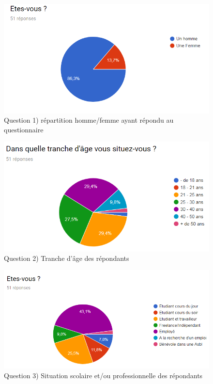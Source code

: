 \documentclass[a4paper,fleqn,12pt,oneside]{report}
\begin{document}
\begin{figure}[!ht]
\centering
\includegraphics[scale=1]{figures/QHF.png}
\caption{Question 1) répartition homme/femme ayant répondu au questionnaire}
\label{fig:QHF}
\end{figure}

\begin{figure}[!ht]
\centering
\includegraphics[scale=1]{figures/QAge.png}
\caption{Question 2) Tranche d'âge des répondants}
\label{fig:QAge}
\end{figure}

\newpage
{}

\begin{figure}[!ht]
\centering
\includegraphics[scale=1]{figures/QStatus.png}
\caption{Question 3) Situation scolaire et/ou professionnelle des répondants}
\label{fig:QStatus}
\end{figure}
\end{document}
